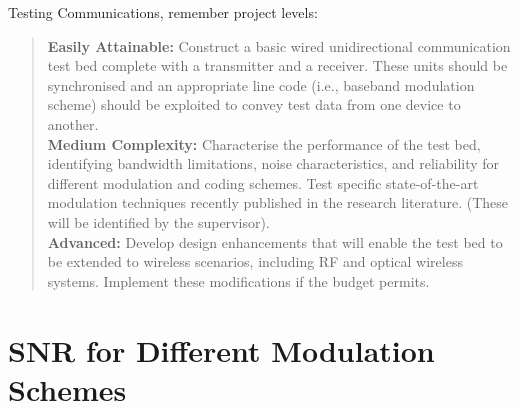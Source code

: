 \documentclass[../main.tex]{subfiles}
\begin{document}

Testing Communications, remember project levels:\\

\begin{quotation}
	\textbf{Easily Attainable:}
	Construct a basic wired unidirectional communication test bed complete with a transmitter and a receiver.
	These units should be synchronised and an appropriate line code (i.e., baseband modulation scheme) should be exploited to convey test data from one device to another.\\
	
	\textbf{Medium Complexity:}
	Characterise the performance of the test bed, identifying bandwidth limitations, noise characteristics, and reliability for different modulation and coding schemes. Test specific state-of-the-art modulation techniques recently published in the research literature. (These will be identified by the supervisor).\\
	
	\textbf{Advanced:}
	Develop design enhancements that will enable the test bed to be extended to wireless scenarios, including RF and optical wireless systems.
	Implement these modifications if the budget permits.
\end{quotation}



\section{SNR for Different Modulation Schemes}


\end{document}
